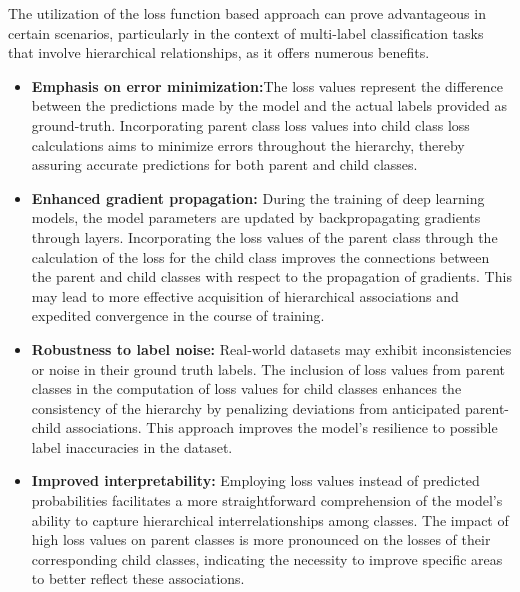 The utilization of the loss function based approach can prove advantageous in certain scenarios, particularly in the context of multi-label classification tasks that involve hierarchical relationships, as it offers numerous benefits.
\begin{itemize}
    \item \textbf{Emphasis on error minimization:}The loss values represent the difference between the predictions made by the model and the actual labels provided as ground-truth. Incorporating parent class loss values into child class loss calculations aims to minimize errors throughout the hierarchy, thereby assuring accurate predictions for both parent and child classes.
    \item \textbf{Enhanced gradient propagation:} During the training of deep learning models, the model parameters are updated by backpropagating gradients through layers. Incorporating the loss values of the parent class through the calculation of the loss for the child class improves the connections between the parent and child classes with respect to the propagation of gradients. This may lead to more effective acquisition of hierarchical associations and expedited convergence in the course of training.
    \item \textbf{Robustness to label noise:} Real-world datasets may exhibit inconsistencies or noise in their ground truth labels. The inclusion of loss values from parent classes in the computation of loss values for child classes enhances the consistency of the hierarchy by penalizing deviations from anticipated parent-child associations. This approach improves the model's resilience to possible label inaccuracies in the dataset.
    \item \textbf{Improved interpretability:} Employing loss values instead of predicted probabilities facilitates a more straightforward comprehension of the model's ability to capture hierarchical interrelationships among classes. The impact of high loss values on parent classes is more pronounced on the losses of their corresponding child classes, indicating the necessity to improve specific areas to better reflect these associations.
\end{itemize}
